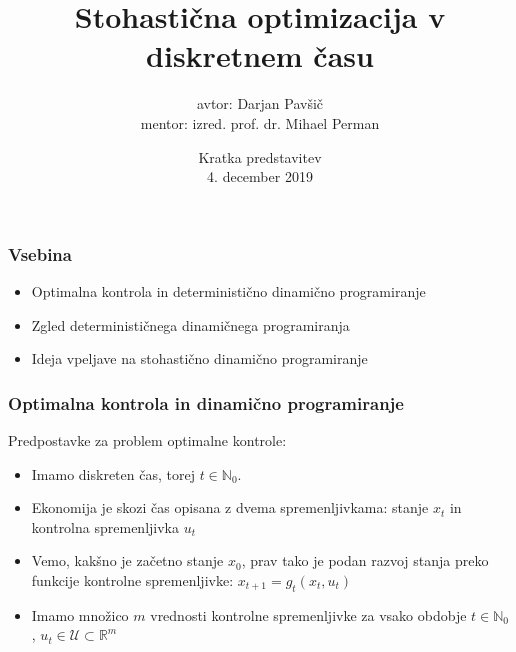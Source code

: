 \documentclass{beamer}
\title{Stohastična optimizacija v diskretnem času}
\author{avtor: Darjan Pavšič \\ mentor: izred. prof. dr. Mihael Perman}
\institute[Fakulteta za matematiko in fiziko, Univerza v Ljubljani]
\date[4. december 2019]
{Kratka predstavitev \\ 4. december 2019}
\begin{document}
\begin{frame}
\titlepage
\end{frame}

\begin{frame}
\frametitle{Vsebina}

\begin{itemize}
\item{Optimalna kontrola in deterministično dinamično programiranje}\newline
\item{Zgled determinističnega dinamičnega programiranja}\newline
\item{Ideja vpeljave na stohastično dinamično programiranje}
\end{itemize}

\end{frame}

%
%
%
%


\begin{frame}
\frametitle{Optimalna kontrola in dinamično programiranje}

Predpostavke za problem optimalne kontrole: \newline

\begin{itemize} 

\item Imamo diskreten čas, torej $t \in \mathbb{N}_0$. 
\item Ekonomija je skozi čas opisana z dvema spremenljivkama: stanje $x_t$ in kontrolna spremenljivka $u_t$
\item Vemo, kakšno je začetno stanje $x_0$, prav tako je podan razvoj stanja preko funkcije kontrolne spremenljivke: $x_{t+1} = g_t(x_t,u_t)$
\item Imamo množico $m$ vrednosti kontrolne spremenljivke za vsako obdobje $t \in \mathbb{N}_0$, $u_t \in \mathcal{U} \subset \mathbb{R}^m$

\end{itemize}

\end{frame}
\end{document}
